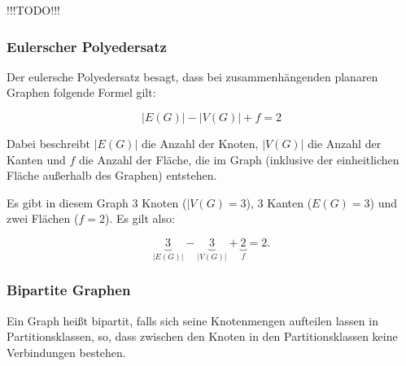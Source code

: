 \documentclass{scrartcl}
\newcommand{\TODO}{%
{\Huge\textcolor{HeavyRed}{\danger !!!TODO!!! \danger}}%
}
\begin{document}
\TODO

\subsubsection{Eulerscher Polyedersatz}

Der eulersche Polyedersatz besagt, dass bei zusammenhängenden planaren Graphen
folgende Formel gilt:

\begin{equation}
	|E(G)| - |V(G)| + f = 2
\end{equation}

Dabei beschreibt $|E(G)|$ die Anzahl der Knoten, $|V(G)|$ die Anzahl der Kanten
und $f$ die Anzahl der Fläche, die im Graph (inklusive der einheitlichen Fläche
außerhalb des Graphen) entstehen.

\begin{center}
\end{center}

Es gibt in diesem Graph 3 Knoten ($|V(G) = 3$), 3 Kanten ($E(G) = 3$) und zwei
Flächen ($f = 2$). Es gilt also:

\begin{equation}
	\underbrace{3}_{|E(G)|} - \underbrace{3}_{|V(G)|} + \underbrace{2}_{f} = 2.
\end{equation}

\subsubsection{Bipartite Graphen}

Ein Graph heißt \frq bipartit\flq, falls sich seine Knotenmengen aufteilen lassen
in Partitionsklassen, so, dass zwischen den Knoten in den Partitionsklassen keine
Verbindungen bestehen.
\end{document}
